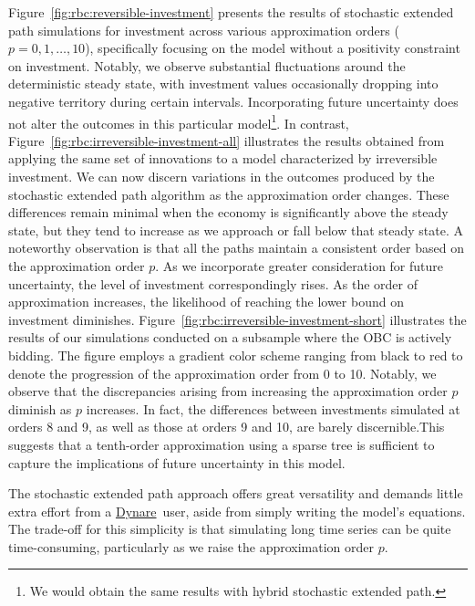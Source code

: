\documentclass[a4paper,11pt]{amsart}
\newcommand{\Dynare}{\href{http://www.dynare.org}{Dynare}}
\begin{document}
Figure~\ref{fig:rbc:reversible-investment} presents the results of
stochastic extended path simulations for investment across various
approximation orders (\(p=0,1,\ldots,10\)), specifically focusing on
the model without a positivity constraint on investment. Notably, we
observe substantial fluctuations around the deterministic steady
state, with investment values occasionally dropping into negative
territory during certain intervals. Incorporating future uncertainty
does not alter the outcomes in this particular model\footnote{We would
   obtain the same results with hybrid stochastic extended path.}. In
contrast, Figure~\ref{fig:rbc:irreversible-investment-all} illustrates the
results obtained from applying the same set of innovations to a model
characterized by irreversible investment. We can now discern
variations in the outcomes produced by the stochastic extended path
algorithm as the approximation order changes. These differences remain
minimal when the economy is significantly above the steady state, but
they tend to increase as we approach or fall below that steady
state. A noteworthy observation is that all the paths maintain a
consistent order based on the approximation order \(p\). As we
incorporate greater consideration for future uncertainty, the level of
investment correspondingly rises. As the order of approximation
increases, the likelihood of reaching the lower bound on investment
diminishes. Figure~\ref{fig:rbc:irreversible-investment-short}
illustrates the results of our simulations conducted on a subsample
where the OBC is actively bidding. The figure employs a gradient color
scheme ranging from black to red to denote the progression of the
approximation order from 0 to 10. Notably, we observe that the
discrepancies arising from increasing the approximation order \( p \)
diminish as \( p \) increases. In fact, the differences between
investments simulated at orders 8 and 9, as well as those at orders 9
and 10, are barely discernible.This suggests that a tenth-order
approximation using a sparse tree is sufficient to capture the
implications of future uncertainty in this model.\newline

The stochastic extended path approach offers great versatility and
demands little extra effort from a \Dynare\, user, aside from simply
writing the model's equations. The trade-off for this simplicity is
that simulating long time series can be quite time-consuming,
particularly as we raise the approximation order $p$.\newline
\end{document}
